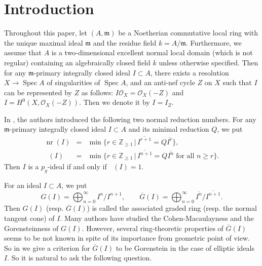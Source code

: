 \documentclass[12pt]{amsart}
\theoremstyle{definition}
\theoremstyle{remark}
\numberwithin{equation}{section}
\DeclareMathOperator{\Spec}{Spec}
\DeclareMathOperator{\spec}{Spec}
\DeclareMathOperator{\nr}{nr}
\DeclareMathOperator{\br}{\bar r}
\newcommand{\m}{\mathfrak m}
\newcommand{\bbZ}{\ensuremath{\mathbb Z}}
\renewcommand{\:}{\colon}
\begin{document}
\maketitle


\section*{Introduction}

Throughout this paper, let $(A,\m)$ be a Noetherian commutative 
local ring with the unique maximal ideal $\m$ and the residue field 
$k=A/\m$. 
Furthermore, we assume that $A$ is a two-dimensional 
excellent normal local domain (which is not regular) 
containing an algebraically closed field $k$ unless otherwise specified. 
 Then for any $\m$-primary integrally closed ideal $I \subset A$, there exists a resolution $X\to \spec A$ of singularities of $\Spec A$, and an anti-nef cycle $Z$ on $X$ such that $I$ can be
represented  by $Z$ as follows:  
$I\mathcal{O}_X=\mathcal{O}_X(-Z)$ and $I=H^0(X,\mathcal{O}_X(-Z))$. 
Then we denote it by $I=I_Z$. 



\par \vspace{3mm}
In \cite{OWY4}, the authors introduced the following two 
normal reduction numbers. 
For any $\m$-primary integrally closed ideal $I \subset A$ and 
its minimal reduction $Q$, we put  
\begin{eqnarray*}
\nr(I) &=& \min\{r \in \bbZ_{\ge 1} \,|\,  \overline{I^{r+1}}=Q \overline{I^r}\}, \\
\br(I)&=&\min\{r \in \bbZ_{\ge 1} \,|\, \overline{I^{n+1}}=Q \overline{I^n} 
\; \text{for all $n \ge r$}\}. 
\end{eqnarray*}
Then $I$ is a $p_g$-ideal if and only if $\br(I)=1$. 


\par \vspace{3mm}
For an ideal $I \subset A$, we put 
\[
G(I)=\bigoplus_{n=0}^{\infty} I^n/I^{n+1}, \qquad 
\overline{G}(I)=\bigoplus_{n=0}^{\infty} \overline{I^n}/\overline{I^{n+1}}. 
\] 
Then $G(I)$ (resp. $\overline{G}(I)$) 
is called the associated graded ring (resp. 
the normal tangent cone) of $I$. 
Many authors have studied the Cohen-Macaulayness and 
the Gorensteinness of $G(I)$. 
However, several ring-theoretic properties of $\overline{G}(I)$ 
seems to be not known in spite of its importance from geometric point of view. 
So in \cite{OWY6} we give a criterion for $\overline{G}(I)$ to be Gorenstein 
in the case of elliptic ideals $I$. 
So it is natural to ask the following question. 
\end{document}
